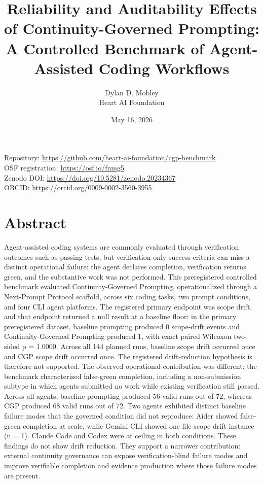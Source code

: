 \documentclass[11pt]{article}
\title{Reliability and Auditability Effects of Continuity-Governed Prompting: A Controlled Benchmark of Agent-Assisted Coding Workflows}
\author{Dylan D. Mobley\\Heart AI Foundation}
\date{May 16, 2026}
\begin{document}
\maketitle

\noindent Repository: \url{https://github.com/heart-ai-foundation/cgp-benchmark}\\
OSF registration: \url{https://osf.io/fnmg5}\\
Zenodo DOI: \url{https://doi.org/10.5281/zenodo.20234367}\\
ORCID: \url{https://orcid.org/0009-0002-3560-3955}

\section*{Abstract}
Agent-assisted coding systems are commonly evaluated through verification outcomes such as passing tests, but verification-only success criteria can miss a distinct operational failure: the agent declares completion, verification returns green, and the substantive work was not performed. This preregistered controlled benchmark evaluated Continuity-Governed Prompting, operationalized through a Next-Prompt Protocol scaffold, across six coding tasks, two prompt conditions, and four CLI agent platforms. The registered primary endpoint was scope drift, and that endpoint returned a null result at a baseline floor: in the primary preregistered dataset, baseline prompting produced 0 scope-drift events and Continuity-Governed Prompting produced 1, with exact paired Wilcoxon two-sided p = 1.0000. Across all 144 planned runs, baseline scope drift occurred once and CGP scope drift occurred once. The registered drift-reduction hypothesis is therefore not supported. The observed operational contribution was different: the benchmark characterized false-green completion, including a non-submission subtype in which agents submitted no work while existing verification still passed. Across all agents, baseline prompting produced 56 valid runs out of 72, whereas CGP produced 68 valid runs out of 72. Two agents exhibited distinct baseline failure modes that the governed condition did not reproduce: Aider showed false-green completion at scale, while Gemini CLI showed one file-scope drift instance (n = 1). Claude Code and Codex were at ceiling in both conditions. These findings do not show drift reduction. They support a narrower contribution: external continuity governance can expose verification-blind failure modes and improve verifiable completion and evidence production where those failure modes are present.
\end{document}
